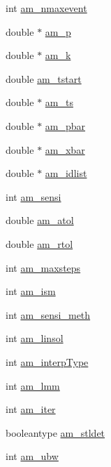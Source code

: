 \begin{DoxyCompactItemize}
\item 
int \hyperlink{struct_user_data_adfa3a6bf6b41a27f98cac31557e6930f}{am\+\_\+nmaxevent}
\item 
double $\ast$ \hyperlink{struct_user_data_a1a679b0e8dfea7d284d777c937d8d13e}{am\+\_\+p}
\item 
double $\ast$ \hyperlink{struct_user_data_a7b59855746129befdcfe9f3c8a4d2a4c}{am\+\_\+k}
\item 
double \hyperlink{struct_user_data_a230439d483e6fde07a6fe687219060c2}{am\+\_\+tstart}
\item 
double $\ast$ \hyperlink{struct_user_data_a368434a79bdb1655bef3adc552834ddc}{am\+\_\+ts}
\item 
double $\ast$ \hyperlink{struct_user_data_aa73d75cc02e28bcdf108cbea53e615e9}{am\+\_\+pbar}
\item 
double $\ast$ \hyperlink{struct_user_data_ad21f2b82715b051daf2775ed059afdbb}{am\+\_\+xbar}
\item 
double $\ast$ \hyperlink{struct_user_data_ab62bd78b1593ddbf3d854356b4dcaa0f}{am\+\_\+idlist}
\item 
int \hyperlink{struct_user_data_a3bd631d595b8a864de83f25a1756ce3d}{am\+\_\+sensi}
\item 
double \hyperlink{struct_user_data_a2aade90998d7e2cefa7953d4fdbc438b}{am\+\_\+atol}
\item 
double \hyperlink{struct_user_data_a2370b78f280747d84a69619ea8c55985}{am\+\_\+rtol}
\item 
int \hyperlink{struct_user_data_a0187950731c16f2857d0cd5b92416352}{am\+\_\+maxsteps}
\item 
int \hyperlink{struct_user_data_a1f2514c0ee00da61ade386173b718a02}{am\+\_\+ism}
\item 
int \hyperlink{struct_user_data_a83bc6716ecf3decb3d963929361fcd6d}{am\+\_\+sensi\+\_\+meth}
\item 
int \hyperlink{struct_user_data_a03fa52449ab4bb9a1a75312fd9064db1}{am\+\_\+linsol}
\item 
int \hyperlink{struct_user_data_a02adc800558b1cdac3fa8bc96e65dbbb}{am\+\_\+interp\+Type}
\item 
int \hyperlink{struct_user_data_a18b6fbc6159783acab9b5f4b106077cd}{am\+\_\+lmm}
\item 
int \hyperlink{struct_user_data_a2e0183eade68209e6835d3199054f0cc}{am\+\_\+iter}
\item 
booleantype \hyperlink{struct_user_data_a7d39c238c319f0164a15744950bfd021}{am\+\_\+stldet}
\item 
int \hyperlink{struct_user_data_a7283826ef630f92bb04052eb79a377e5}{am\+\_\+ubw}

\end{DoxyCompactItemize}
